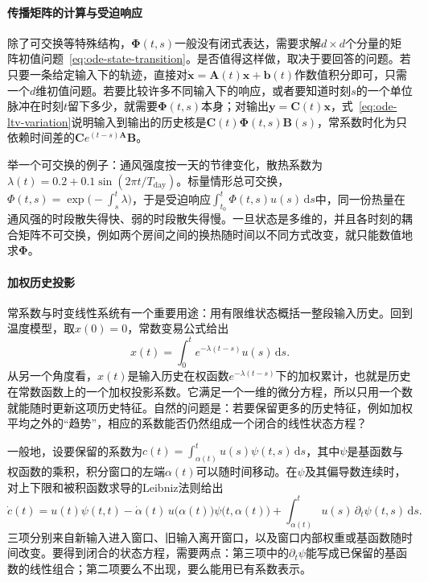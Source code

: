 \paragraph{传播矩阵的计算与受迫响应}
除了可交换等特殊结构，$\bm\Phi(t,s)$一般没有闭式表达，需要求解$d\times d$个分量的矩阵初值问题~\eqref{eq:ode-state-transition}。是否值得这样做，取决于要回答的问题。若只要一条给定输入下的轨迹，直接对$\dot{\bm x}=\bm A(t)\bm x+\bm b(t)$作数值积分即可，只需一个$d$维初值问题。若要比较许多不同输入下的响应，或者要知道时刻$s$的一个单位脉冲在时刻$t$留下多少，就需要$\bm\Phi(t,s)$本身；对输出$\bm y=\bm C(t)\bm x$，式~\eqref{eq:ode-ltv-variation}说明输入到输出的历史核是$\bm C(t)\bm\Phi(t,s)\bm B(s)$，常系数时化为只依赖时间差的$\bm Ce^{(t-s)\bm A}\bm B$。

举一个可交换的例子：通风强度按一天的节律变化，散热系数为$\lambda(t)=0.2+0.1\sin(2\pi t/T_{\mathrm{day}})$。标量情形总可交换，$\Phi(t,s)=\exp\bigl(-\int_s^t\lambda\bigr)$，于是受迫响应$\int_{t_0}^t\Phi(t,s)u(s)\,\mathrm ds$中，同一份热量在通风强的时段散失得快、弱的时段散失得慢。一旦状态是多维的，并且各时刻的耦合矩阵不可交换，例如两个房间之间的换热随时间以不同方式改变，就只能数值地求$\bm\Phi$。

\paragraph{加权历史投影}
常系数与时变线性系统有一个重要用途：用有限维状态概括一整段输入历史。回到温度模型，取$x(0)=0$，常数变易公式给出
\[
  x(t)=\int_0^te^{-\lambda(t-s)}u(s)\,\mathrm ds.
\]
从另一个角度看，$x(t)$是输入历史在权函数$e^{-\lambda(t-s)}$下的加权累计，也就是历史在常数函数上的一个加权投影系数。它满足一个一维的微分方程，所以只用一个数就能随时更新这项历史特征。自然的问题是：若要保留更多的历史特征，例如加权平均之外的“趋势”，相应的系数能否仍然组成一个闭合的线性状态方程？

一般地，设要保留的系数为$c(t)=\int_{\alpha(t)}^{t}u(s)\psi(t,s)\,\mathrm ds$，其中$\psi$是基函数与权函数的乘积，积分窗口的左端$\alpha(t)$可以随时间移动。在$\psi$及其偏导数连续时，对上下限和被积函数求导的Leibniz法则给出
\begin{equation}
  \dot c(t)=u(t)\psi(t,t)-\dot\alpha(t)\,u\bigl(\alpha(t)\bigr)\psi\bigl(t,\alpha(t)\bigr)+\int_{\alpha(t)}^tu(s)\,\partial_t\psi(t,s)\,\mathrm ds.
  \label{eq:ode-history-leibniz}
\end{equation}
三项分别来自新输入进入窗口、旧输入离开窗口，以及窗口内部权重或基函数随时间改变。要得到闭合的状态方程，需要两点：第三项中的$\partial_t\psi$能写成已保留的基函数的线性组合；第二项要么不出现，要么能用已有系数表示。

